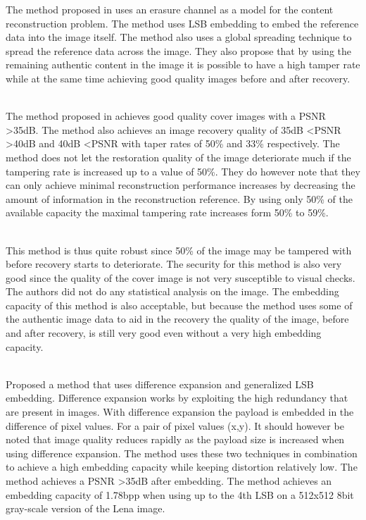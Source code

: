 \documentclass[11pt]{article}
\begin{document}
The method proposed in \cite {korus2013efficient} uses an erasure channel as a model for the content reconstruction problem.
The method uses LSB embedding to embed the reference data into the image itself.
The method also uses a global spreading technique to spread the reference data across the image.
They also propose that by using the remaining authentic content in the image it is possible to have a high tamper rate while at the same time achieving good quality images before and after recovery.

\hspace{0pt} \\
The method proposed in \cite {korus2013efficient} achieves good quality cover images with a PSNR \textgreater 35dB. 
The method also achieves an image recovery quality of 35dB \textless PSNR \textgreater 40dB and 40dB \textless PSNR with taper rates of 50\% and 33\% respectively.
The method does not let the restoration quality of the image deteriorate much if the tampering rate is increased up to a value of 50\%.
They do however note that they can only achieve minimal reconstruction performance increases by decreasing the amount of information in the reconstruction reference.
By using only 50\% of the available capacity the maximal tampering rate increases form 50\% to 59\%.

\hspace{0pt} \\
This method \cite {korus2013efficient} is thus quite robust since 50\% of the image may be tampered with before recovery starts to deteriorate.
The security for this method is also very good since the quality of the cover image is not very susceptible to visual checks.
The authors did not do any statistical analysis on the image.
The embedding capacity of this method is also acceptable, but because the method uses some of the authentic image data to aid in the recovery the quality of the image, before and after recovery, is still very good even without a very high embedding capacity.  

\hspace{0pt} \\
\cite {tian2003high} Proposed a method that uses difference expansion and generalized LSB embedding.
Difference expansion works by exploiting the high redundancy that are present in images.
With difference expansion the payload is embedded in the difference of pixel values. 
For a pair of pixel values (x,y). \cite {tian2002reversible}
It should however be noted that image quality reduces rapidly as the payload size is increased when using difference expansion. 
The method uses these two techniques in combination to achieve a high embedding capacity while keeping distortion relatively low.
The method achieves a PSNR \textgreater 35dB after embedding.
The method achieves an embedding capacity of 1.78bpp when using up to the 4th LSB on a 512x512 8bit gray-scale version of the Lena image.
\end{document}
